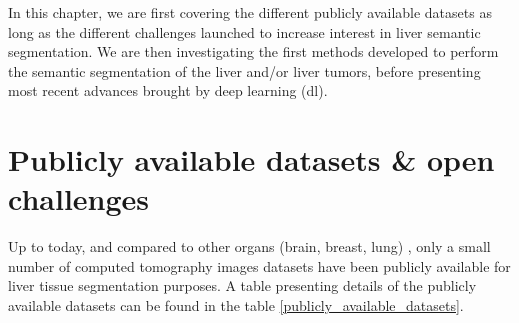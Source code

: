 


In this chapter, we are first covering the different publicly available datasets as long
as the different challenges launched to increase interest in liver
semantic segmentation. We are then investigating the first methods
developed to perform the semantic segmentation of the liver and/or liver
tumors, before presenting most recent advances brought by deep learning (\ac{dl}).


\section{Publicly available datasets \& open challenges}

Up to today, and compared to other organs (brain, breast, lung) \cite{GrandChallenge}, only
a small number of computed tomography images datasets have been publicly
available for liver tissue segmentation purposes. A table presenting
details of the publicly available datasets can be found in the table \ref{publicly_available_datasets}.



